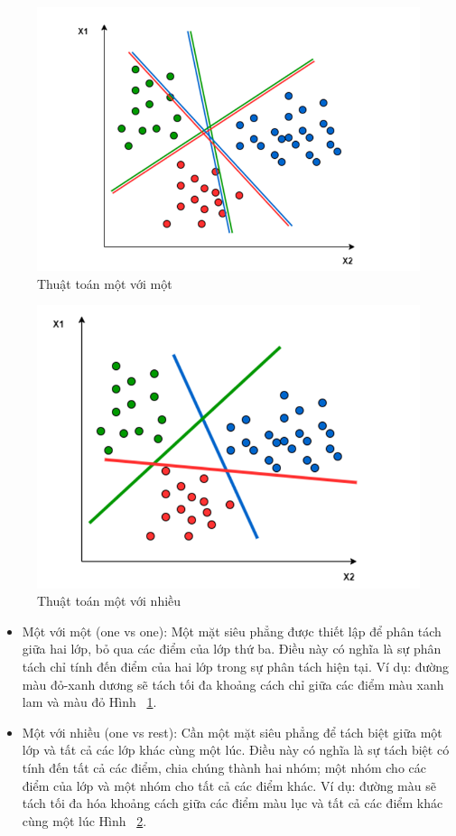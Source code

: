 \begin{figure}
    \centering
    \includegraphics[width=0.6\linewidth]{images/svm_ovso.png}
    \caption{Thuật toán một với một}
    \label{svm_ovso}
\end{figure}



\begin{figure}
    \centering
    \includegraphics[width=0.6\linewidth]{images/ovsr.png}
    \caption{Thuật toán một với nhiều}
    \label{ovsr}
\end{figure}

\begin{itemize}
    \item Một với một (one vs one): Một mặt siêu phẳng được thiết lập để phân tách giữa hai lớp, bỏ qua các điểm của lớp thứ ba. Điều này có nghĩa là sự phân tách chỉ tính đến điểm của hai lớp trong sự phân tách hiện tại. Ví dụ: đường màu đỏ-xanh dương sẽ tách tối đa khoảng cách chỉ giữa các điểm màu xanh lam và màu đỏ Hình ~\ref{svm_ovso}.
    
    \item Một với nhiều (one vs rest): Cần một mặt siêu phẳng để tách biệt giữa một lớp và tất cả các lớp khác cùng một lúc. Điều này có nghĩa là sự tách biệt có tính đến tất cả các điểm, chia chúng thành hai nhóm; một nhóm cho các điểm của lớp và một nhóm cho tất cả các điểm khác. Ví dụ: đường màu sẽ tách tối đa hóa khoảng cách giữa các điểm màu lục và tất cả các điểm khác cùng một lúc Hình ~\ref{ovsr}.
\end{itemize}






